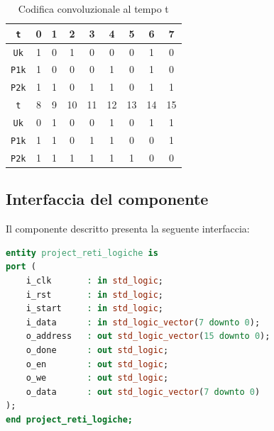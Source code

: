 \documentclass{article}
\begin{document}
\begin{table}[h]
    \centering
    \begin{tabular}{||c|c c c c c c c c||}
        \hline
        \verb|t|   & 0 & 1 & 2 & 3 & 4 & 5 & 6 & 7 \\
        \hline
        \verb|Uk|  & 1 & 0 & 1 & 0 & 0 & 0 & 1 & 0 \\
        \verb|P1k| & 1 & 0 & 0 & 0 & 1 & 0 & 1 & 0 \\
        \verb|P2k| & 1 & 1 & 0 & 1 & 1 & 0 & 1 & 1 \\
        \hline
        \hline
        \verb|t|   & 8 & 9 & 10 & 11 & 12 & 13 & 14 & 15 \\
        \hline
        \verb|Uk|  & 0 & 1 &  0 &  0 &  1 &  0 &  1 &  1 \\
        \verb|P1k| & 1 & 1 &  0 &  1 &  1 &  0 &  0 &  1 \\
        \verb|P2k| & 1 & 1 &  1 &  1 &  1 &  1 &  0 &  0 \\
        \hline
    \end{tabular}
    \vspace{5pt}
    \caption{Codifica convoluzionale al tempo t}
    \label{tab:Conv}
\end{table}

\subsection{Interfaccia del componente}
Il componente descritto presenta la seguente interfaccia:
\begin{lstlisting}[basicstyle=\small, language=VHDL]
entity project_reti_logiche is
port (
	i_clk       : in std_logic;
	i_rst       : in std_logic;
	i_start     : in std_logic;
	i_data      : in std_logic_vector(7 downto 0);
	o_address   : out std_logic_vector(15 downto 0);
	o_done      : out std_logic;
	o_en        : out std_logic;
	o_we        : out std_logic;
	o_data      : out std_logic_vector(7 downto 0)
);
end project_reti_logiche;
\end{lstlisting}
\vspace{10pt}
\end{document}
